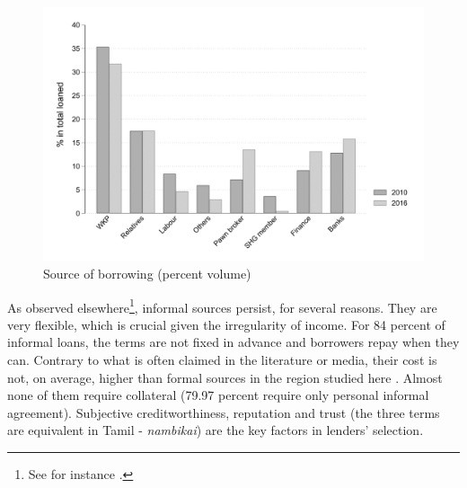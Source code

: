 \documentclass[a4paper, 11pt, onecolumn]{article}
\begin{document}
\begin{figure}[ht]
\center
\includegraphics[width=12cm]{totalloaned.png}
\caption{Source of borrowing (percent volume)}
\label{bar:loaned}
\end{figure}

As observed elsewhere\footnote{See for instance \cite{Morvant2013, Collins2009, Shipton2007, James2015, Saiag2020, Guerin2013}.}, informal sources persist, for several reasons. 
They are very flexible, which is crucial given the irregularity of income. 
For 84 percent of informal loans, the terms are not fixed in advance and borrowers repay when they can. Contrary to what is often claimed in the literature or media, their cost is not, on average, higher than formal sources in the region studied here \citep{Reboul2019}. 
Almost none of them require collateral (79.97 percent require only personal informal agreement). 
Subjective creditworthiness, reputation and trust (the three terms are equivalent in Tamil - \textit{nambikai}) are the key factors in lenders' selection. 
\end{document}
